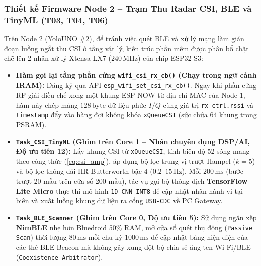 \documentclass{hcmut-report}
\begin{document}
\subsubsection[Firmware Node 2 -- Trạm Thu CSI, BLE và TinyML (T03, T04, T06)]{Thiết kế Firmware Node 2 -- Trạm Thu Radar CSI, BLE và TinyML (T03, T04, T06)}
Trên Node 2 (YoloUNO \#2), để tránh việc quét BLE và xử lý mạng làm gián đoạn luồng ngắt thu CSI ở tầng vật lý, kiến trúc phần mềm được phân bổ chặt chẽ lên 2 nhân xử lý Xtensa LX7 ($240\,\text{MHz}$) của chip ESP32-S3:
\begin{itemize}
  \item \textbf{Hàm gọi lại tầng phần cứng \texttt{wifi\_csi\_rx\_cb()} (Chạy trong ngữ cảnh IRAM):} Đăng ký qua API \texttt{esp\_wifi\_set\_csi\_rx\_cb()}. Ngay khi phần cứng RF giải điều chế xong một khung ESP-NOW từ địa chỉ MAC của Node 1, hàm này chép mảng $128\,\text{byte}$ dữ liệu phức $I/Q$ cùng giá trị \texttt{rx\_ctrl.rssi} và \texttt{timestamp} đẩy vào hàng đợi không khóa \texttt{xQueueCSI} (sức chứa 64 khung trong PSRAM).
  \item \textbf{\texttt{Task\_CSI\_TinyML} (Ghim trên Core 1 -- Nhân chuyên dụng DSP/AI, Độ ưu tiên 12):} Lấy khung CSI từ \texttt{xQueueCSI}, tính biên độ 52 sóng mang theo công thức (\ref{eq:csi_amp}), áp dụng bộ lọc trung vị trượt Hampel ($k=5$) và bộ lọc thông dải IIR Butterworth bậc 4 ($0.2\text{--}15\,\text{Hz}$). Mỗi $200\,\text{ms}$ (bước trượt 20 mẫu trên cửa sổ 200 mẫu), tác vụ gọi bộ thông dịch \textbf{TensorFlow Lite Micro} thực thi mô hình \texttt{1D-CNN INT8} để cập nhật nhãn hành vi tại biên và xuất luồng khung dữ liệu ra cổng \texttt{USB-CDC} về PC Gateway.
  \item \textbf{\texttt{Task\_BLE\_Scanner} (Ghim trên Core 0, Độ ưu tiên 5):} Sử dụng ngăn xếp \textbf{NimBLE} nhẹ hơn Bluedroid 50\% RAM, mở cửa sổ quét thụ động (\texttt{Passive Scan}) thời lượng $80\,\text{ms}$ mỗi chu kỳ $1000\,\text{ms}$ để cập nhật bảng hiện diện của các thẻ BLE Beacon mà không gây xung đột bộ chia sẻ ăng-ten Wi-Fi/BLE (\texttt{Coexistence Arbitrator}).
\end{itemize}
\end{document}
